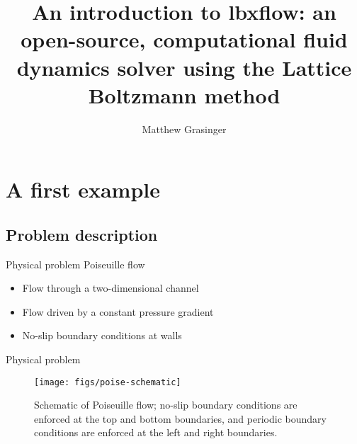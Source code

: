 \documentclass[pdf]{beamer}
\title{An introduction to lbxflow: an open-source, computational fluid dynamics solver using the Lattice Boltzmann method}
\author{Matthew Grasinger}
\begin{document}
\begin{frame}
\titlepage
\end{frame}

\section{A first example}

\subsection{Problem description}

\begin{frame}{Physical problem}
  Poiseuille flow
  \begin{itemize}
    \item Flow through a two-dimensional channel
    \item Flow driven by a constant pressure gradient
    \item No-slip boundary conditions at walls
  \end{itemize}
\end{frame}

\begin{frame}{Physical problem}
  \begin{figure} \label{fig:poise-schematic}
    \texttt{[image: figs/poise-schematic]}
    \caption{Schematic of Poiseuille flow; no-slip boundary conditions are enforced at the top and bottom boundaries, and periodic boundary conditions are enforced at the left and right boundaries.}
  \end{figure}
\end{frame}
\end{document}
